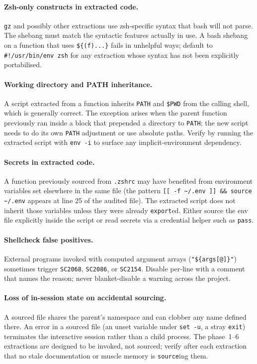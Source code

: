 \documentclass[11pt,letterpaper]{scrartcl}
\begin{document}
\paragraph{Zsh-only constructs in extracted code.}
\texttt{gz} and possibly other extractions use zsh-specific
syntax that bash will not parse. The shebang must match the
syntactic features actually in use. A bash shebang on a function
that uses \texttt{\$\{(f)...\}} fails in unhelpful ways; default
to \texttt{\#!/usr/bin/env zsh} for any extraction whose syntax
has not been explicitly portabilised.

\paragraph{Working directory and PATH inheritance.}
A script extracted from a function inherits \texttt{PATH} and
\texttt{\$PWD} from the calling shell, which is generally
correct. The exception arises when the parent function previously
ran inside a block that prepended a directory to \texttt{PATH};
the new script needs to do its own \texttt{PATH} adjustment or
use absolute paths. Verify by running the extracted script with
\texttt{env -i} to surface any implicit-environment dependency.

\paragraph{Secrets in extracted code.}
A function previously sourced from \texttt{.zshrc} may have
benefited from environment variables set elsewhere in the same
file (the pattern \texttt{[[ -f \textasciitilde/.env ]] \&\& source
\textasciitilde/.env} appears at line 25 of the audited file).
The extracted script does not inherit those variables unless they
were already \texttt{export}ed. Either source the env file
explicitly inside the script or read secrets via a credential
helper such as \texttt{pass}.

\paragraph{Shellcheck false positives.}
External programs invoked with computed argument arrays
(\texttt{"\$\{args[@]\}"}) sometimes trigger \texttt{SC2068},
\texttt{SC2086}, or \texttt{SC2154}. Disable per-line with a
comment that names the reason; never blanket-disable a warning
across the project.

\paragraph{Loss of in-session state on accidental sourcing.}
A sourced file shares the parent's namespace and can clobber any
name defined there. An error in a sourced file (an unset variable
under \texttt{set -u}, a stray \texttt{exit}) terminates the
interactive session rather than a child process. The phase~1--6
extractions are designed to be invoked, not sourced; verify after
each extraction that no stale documentation or muscle memory is
\texttt{source}ing them.
\end{document}
